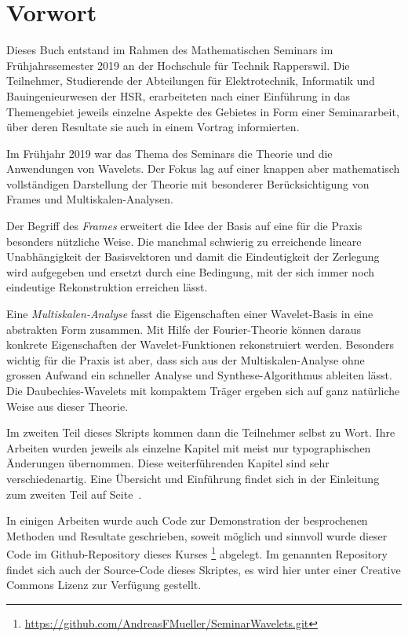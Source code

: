 %
%
%
\chapter*{Vorwort}
\rhead{}
Dieses Buch entstand im Rahmen des Mathematischen Seminars
im Frühjahrssemester 2019 an der Hochschule für Technik Rapperswil.
Die Teilnehmer, Studierende der Abteilungen für Elektrotechnik,
Informatik und Bauingenieurwesen der
HSR, erarbeiteten nach einer Einführung in das Themengebiet jeweils
einzelne Aspekte des Gebietes in Form einer Seminararbeit, über
deren Resultate sie auch in einem Vortrag informierten. 

Im Frühjahr 2019 war das Thema des Seminars die Theorie und die Anwendungen
von Wavelets.
Der Fokus lag auf einer knappen aber mathematisch vollständigen 
Darstellung der Theorie mit besonderer Berücksichtigung von Frames
und Multiskalen-Analysen.

Der Begriff des {\em Frames} erweitert die Idee der Basis auf eine
für die Praxis besonders nützliche Weise.
Die manchmal schwierig zu erreichende lineare Unabhängigkeit der
Basisvektoren und damit die Eindeutigkeit der Zerlegung wird aufgegeben
und ersetzt durch eine Bedingung, mit der sich immer noch eindeutige
Rekonstruktion erreichen lässt.

Eine {\em Multiskalen-Analyse} fasst die Eigenschaften einer Wavelet-Basis
in eine abstrakten Form zusammen.
Mit Hilfe der Fourier-Theorie können daraus konkrete Eigenschaften der
Wavelet-Funk\-tionen rekonstruiert werden.
Besonders wichtig für die Praxis ist aber, dass sich aus der
Multiskalen-Analyse ohne grossen Aufwand ein schneller Analyse und
Synthese-Algorithmus ableiten lässt.
Die Daubechies-Wavelets mit kompaktem Träger ergeben sich auf ganz
natürliche Weise aus dieser Theorie.

Im zweiten Teil dieses Skripts kommen dann die Teilnehmer selbst zu Wort.
Ihre Arbeiten wurden jeweils als einzelne
Kapitel mit meist nur typographischen Änderungen übernommen.
Diese weiterführenden Kapitel sind sehr verschiedenartig.
Eine Übersicht und Einführung findet sich in der Einleitung
zum zweiten Teil auf Seite~\pageref{buch:uebersicht}.

In einigen Arbeiten wurde auch Code zur Demonstration der 
besprochenen Methoden und Resultate geschrieben, soweit
möglich und sinnvoll wurde dieser Code im Github-Repository
dieses Kurses%
\footnote{\url{https://github.com/AndreasFMueller/SeminarWavelets.git}}
\cite{buch:repo}
abgelegt.
Im genannten Repository findet sich auch der Source-Code dieses
Skriptes, es wird hier unter einer Creative Commons Lizenz
zur Verfügung gestellt.




